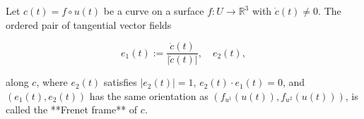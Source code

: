 Let $c(t) = f \circ u(t)$ be a curve on a surface $f: U \to \mathbb{R}^3$ with $\dot{c}(t) \neq 0$. The ordered pair of tangential vector fields

$$e_1(t) := \frac{\dot{c}(t)}{|\dot{c}(t)|}, \quad e_2(t),$$

along $c$, where $e_2(t)$ satisfies $|e_2(t)| = 1$, $e_2(t) \cdot e_1(t) = 0$, and $(e_1(t), e_2(t))$ has the same orientation as $(f_{u^1}(u(t)), f_{u^2}(u(t)))$, is called the **Frenet frame** of $c$.
